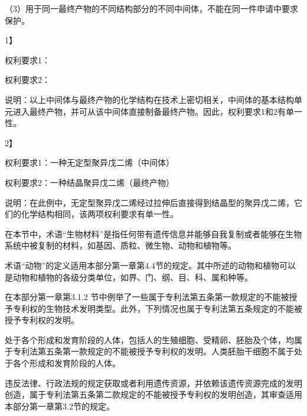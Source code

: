 {\setlength{\parindent}{17.1bp}（3）用于同一最终产物的不同结构部分的不同中间体，不能在同一件申请中要求保护。\par}

{1】\par}

权利要求1：

权利要求2：

说明：以上中间体与最终产物的化学结构在技术上密切相关，中间体的基本结构单元进入最终产物，并可从该中间体直接制备最终产物。因此，权利要求1和2有单一性。

{2】\par}

权利要求1：一种无定型聚异戊二烯（中间体）

权利要求2：一种结晶聚异戊二烯（最终产物）

说明：在此例中，无定型聚异戊二烯经过拉伸后直接得到结晶型的聚异戊二烯，它们的化学结构相同，该两项权利要求有单一性。

在本节中，术语“生物材料”是指任何带有遗传信息并能够自我复制或者能够在生物系统中被复制的材料，如基因、质粒、微生物、动物和植物等。

术语“动物”的定义适用本部分第一章第4.4节的规定。其中所述的动物和植物可以是动物和植物的各级分类单位，如界、门、纲、目、科、属和种等。

在本部分第一章第3.1.2 节中例举了一些属于专利法第五条第一款规定的不能被授予专利权的生物技术发明类型。此外，下列情况也属于专利法第五条规定的不能被授予专利权的发明。

处于各个形成和发育阶段的人体，包括人的生殖细胞、受精卵、胚胎及个体，均属于专利法第五条第一款规定的不能被授予专利权的发明。人类胚胎干细胞不属于处于各个形成和发育阶段的人体。

违反法律、行政法规的规定获取或者利用遗传资源，并依赖该遗传资源完成的发明创造，属于专利法第五条第二款规定的不能被授予专利权的发明创造，其审查适用本部分第一章第3.2节的规定。

